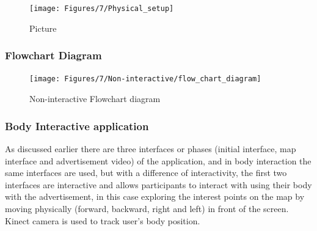 \begin{figure}[H]
    \centering
    \texttt{[image: Figures/7/Physical\_setup]}
    \caption{Picture}%
    \label{fig:hardwaresetup}%
\end{figure}



\subsubsection{Flowchart Diagram}

\begin{figure}[H]
    \centering
    \texttt{[image: Figures/7/Non-interactive/flow\_chart\_diagram]}
    \caption{Non-interactive Flowchart diagram}%
    \label{fig:non_inter_flowchart}%
\end{figure}
\fi


\subsubsection{Body Interactive application}
As discussed earlier there are three interfaces or phases (initial interface, map interface and advertisement video) of the application, and in body interaction the same interfaces are used, but with a difference of interactivity, the first two interfaces are interactive and allows participants to interact with using their body with the advertisement, in this case exploring the interest points on the map by moving physically (forward, backward, right and left) in front of the screen. Kinect camera is used to track user’s body position.

